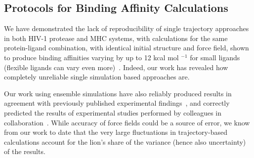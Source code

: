 
\subsection{Protocols for Binding Affinity Calculations}

We have demonstrated the lack of reproducibility of single trajectory
approaches in both HIV-1 protease and MHC systems, with calculations for the
same protein-ligand combination, with identical initial structure and force
field, shown to produce binding affinities varying by up to 12 kcal mol
$^{-1}$ for small ligands (flexible ligands can vary even
more)~\cite{Wan2015, Sadiq2010, Wright2014}. Indeed, our work has revealed
how completely unreliable single simulation based approaches are. 

Our work using ensemble simulations have also reliably produced results in
agreement with previously published experimental findings~\cite{Sadiq2010,
Wan2011, Wright2014, Bhati2017, Wan2017brd4, Wan2017trk}, and correctly
predicted the results of experimental studies performed by colleagues in
collaboration~\cite{Bunney2015}. While accuracy of force fields could be a
source of error, we know from our work to date that the very large
fluctuations in trajectory-based calculations account for the lion’s share of
the variance (hence also uncertainty) of the results.




